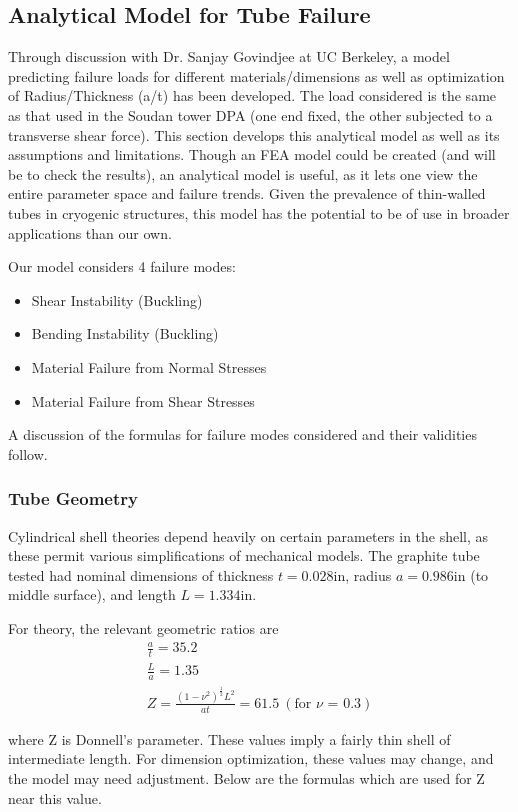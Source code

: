 \documentclass{report}
\begin{document}
\subsection{Analytical Model for Tube Failure}

Through discussion with Dr. Sanjay Govindjee at UC Berkeley, a model predicting failure loads for different materials/dimensions as well as optimization of Radius/Thickness (a/t) has been developed. The load considered is the same as that used in the Soudan tower DPA (one end fixed, the other subjected to a transverse shear force). This section develops this analytical model as well as its assumptions and limitations. Though an FEA model could be created (and will be to check the results), an analytical model is useful, as it lets one view the entire parameter space and failure trends. Given the prevalence of thin-walled tubes in cryogenic structures, this model has the potential to be of use in broader applications than our own.

Our model considers 4 failure modes:
\begin{itemize}
\item Shear Instability (Buckling)
\item Bending Instability (Buckling)
\item Material Failure from Normal Stresses
\item Material Failure from Shear Stresses
\end{itemize}

A discussion of the formulas for failure modes considered and their validities follow.

\subsubsection{Tube Geometry}
Cylindrical shell theories depend heavily on certain parameters in the shell, as these permit various simplifications of mechanical models. The graphite tube tested had nominal dimensions of thickness $t = 0.028$in, radius $a = 0.986$in (to middle surface), and length $L=1.334$in.

For theory, the relevant geometric ratios are
\begin{eqnarray}
\frac{a}{t} = 35.2 \\
\frac{L}{a} = 1.35 \\
Z = \frac{(1-\nu^2)^\frac{1}{2}L^2}{at} = 61.5 \ (\text{for $\nu$ = 0.3})
\end{eqnarray}

where Z is Donnell's parameter. These values imply a fairly thin shell of intermediate length. For dimension optimization, these values may change, and the model may need adjustment. Below are the formulas which are used for Z near this value.
\end{document}
